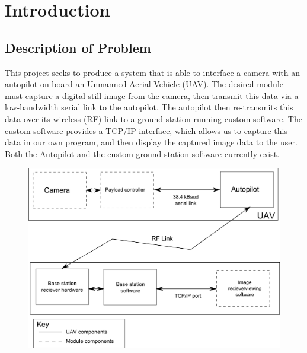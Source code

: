 \chapter{Introduction}

\section{Description of Problem}

This project seeks to produce a system that is able to interface a camera 
with an autopilot on board an Unmanned Aerial Vehicle (UAV). The desired 
module must capture a digital still image from the camera, then transmit 
this data via a low-bandwidth serial link to the autopilot. The autopilot 
then re-transmits this data over its wireless (RF) link to a ground station 
running custom software. The custom software provides a TCP/IP interface, 
which allows us to capture this data in our own program, and then display 
the captured image data to the user. Both the Autopilot and the custom ground 
station software currently exist.

\begin{figure}[H]
        \centering
        \includegraphics[width=1.00\textwidth]{figures/spec_block_diagram_2.png}
        \label{fig:blockDiagram}
\end{figure}

